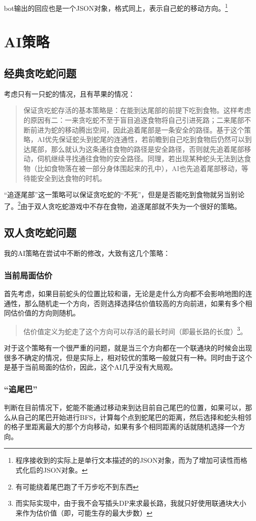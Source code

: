 \documentclass[11pt, a4paper]{article}
\begin{document}
			bot输出的回应也是一个JSON对象，格式同上，表示自己蛇的移动方向。\footnote{程序接收到的实际上是单行文本描述的的JSON对象，而为了增加可读性而格式化后的JSON对象。}
	\section{AI策略}
		\subsection{经典贪吃蛇问题}
			考虑只有一只蛇的情况，且有苹果的情况：
			\begin{quote}
				保证贪吃蛇存活的基本策略是：在能到达尾部的前提下吃到食物。这样考虑的原因有二：一来贪吃蛇不至于盲目追逐食物将自己引进死路；二来尾部不断前进为蛇的移动腾出空间，因此追着尾部是一条安全的路径。基于这个策略，AI优先保证蛇头到蛇尾的连通性，若前瞻到自己吃到食物后仍然可以到达尾部，那么就认为这条通往食物的路径是安全路径，否则就先追着尾部移动，伺机继续寻找通往食物的安全路径。同理，若出现某种蛇头无法到达食物（比如食物落在被一部分身体围起来的孔中），AI也先追着尾部移动，等待能安全到达食物的时机。
			\end{quote}
			
			“追逐尾部”这一策略可以保证贪吃蛇的“不死”，但是是否能吃到食物就另当别论了。\footnote{有可能绕着尾巴跑了千万步吃不到东西}由于双人贪吃蛇游戏中不存在食物，追逐尾部就不失为一个很好的策略。
		\subsection{双人贪吃蛇问题}
			我的AI策略在尝试中不断的修改，大致有这几个策略：
			\subsubsection{当前局面估价}
				首先考虑，如果目前蛇头的位置比较和谐，无论是走什么方向都不会影响地图的连通性，那么随机走一个方向，否则选择选择估价值较高的方向前进，如果有多个相同估价值的方向则随机。
				\begin{quote}
					估价值定义为蛇走了这个方向可以存活的最长时间（即最长路的长度）\footnote{而实际实现中，由于我不会写插头DP来求最长路，我就只好使用联通块大小来作为估价值（即，可能生存的最大步数）}。					
				\end{quote}

				对于这个策略有一个很严重的问题，就是当三个方向都在一个联通块的时候会出现很多不确定的情况，但是实际上，相对较优的策略一般就只有一种。同时由于这个是基于当前局面的估价，因此，这个AI几乎没有大局观。
			\subsubsection{“追尾巴”}
				判断在目前情况下，蛇能不能通过移动来到达目前自己尾巴的位置，如果可以，那么从自己的尾巴开始进行BFS，计算每个点到蛇尾巴的距离，然后选择和蛇头相邻的格子里距离最大的那个方向移动，如果有多个相同距离的话就随机选择一个方向。
				
\end{document}
